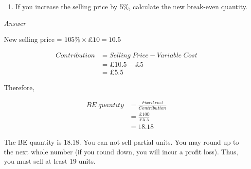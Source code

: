 \documentclass[
  letterpaper,
  DIV=11,
  numbers=noendperiod]{scrartcl}
\providecommand{\tightlist}{%
  \setlength{\itemsep}{0pt}\setlength{\parskip}{0pt}}\usepackage{longtable,booktabs,array}
\begin{document}
\begin{enumerate}
\def\labelenumi{\arabic{enumi}.}
\setcounter{enumi}{1}
\tightlist
\item
  If you increase the selling price by 5\%, calculate the new break-even
  quantity.
\end{enumerate}

\emph{Answer}

New selling price = \(105 \% \times £10 = 10.5\)

\begin{align}
Contribution &= Selling \; Price - Variable \; Cost \\
&= £10.5 - £5 \\
& = £5.5
\end{align}

Therefore,

\begin{align}
BE \; quantity &= \frac{Fixed \ cost}{Contribution} \\
&= \frac{£100}{£5.5} \\
&= 18.18 
\end{align}

The BE quantity is 18.18. You can not sell partial units. You may round
up to the next whole number (if you round down, you will incur a profit
loss). Thus, you must sell at least 19 units.
\end{document}
